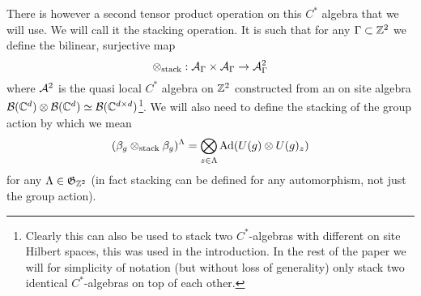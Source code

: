 \documentclass[11pt,a4paper,twoside]{article}
\numberwithin{equation}{section}
\begin{document}
There is however a second tensor product operation on this $C^*$ algebra that we will use. We will call it the stacking operation. It is such that for any $\Gamma\subset\ZZ^2$ we define the bilinear, surjective map
\begin{equation}
	\otimes_{\text{stack}}:\AA_{\Gamma}\times\AA_{\Gamma}\rightarrow \AA^2_{\Gamma}
\end{equation}
where $\AA^2$ is the quasi local $C^*$ algebra on $\ZZ^2$ constructed from an on site algebra $\BB(\CC^d)\otimes\BB(\CC^d)\simeq \BB(\CC^{d\times d})$\footnote{Clearly this can also be used to stack two $C^*$-algebras with different on site Hilbert spaces, this was used in the introduction. In the rest of the paper we will for simplicity of notation (but without loss of generality) only stack two identical $C^*$-algebras on top of each other.}. We will also need to define the stacking of the group action by which we mean
\begin{equation}
	(\beta_g\otimes_{\text{stack}}\beta_g)^\Lambda=\bigotimes_{z\in\Lambda}\Ad{U(g)\otimes U(g)_z}
\end{equation}
for any $\Lambda\in\mathfrak{G}_{\ZZ^2}$ (in fact stacking can be defined for any automorphism, not just the group action).
\end{document}
